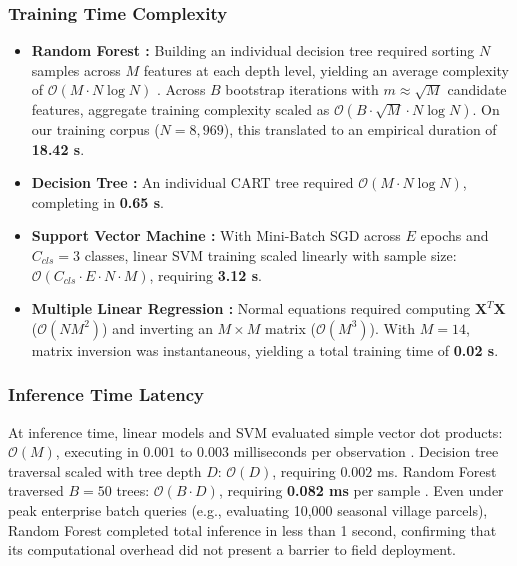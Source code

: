 \documentclass[conference]{IEEEtran}
\begin{document}
\subsubsection{Training Time Complexity}
\begin{itemize}
    \item \textbf{Random Forest \cite{breiman2001}:} Building an individual decision tree required sorting $N$ samples across $M$ features at each depth level, yielding an average complexity of $\mathcal{O}(M \cdot N \log N)$ \cite{quinlan1986}. Across $B$ bootstrap iterations with $m \approx \sqrt{M}$ candidate features, aggregate training complexity scaled as $\mathcal{O}(B \cdot \sqrt{M} \cdot N \log N)$. On our training corpus ($N=8,969$), this translated to an empirical duration of \textbf{18.42 s}.
    \item \textbf{Decision Tree \cite{quinlan1986}:} An individual CART tree required $\mathcal{O}(M \cdot N \log N)$, completing in \textbf{0.65 s}.
    \item \textbf{Support Vector Machine \cite{cortes1995}:} With Mini-Batch SGD across $E$ epochs and $C_{cls}=3$ classes, linear SVM training scaled linearly with sample size: $\mathcal{O}(C_{cls} \cdot E \cdot N \cdot M)$, requiring \textbf{3.12 s}.
    \item \textbf{Multiple Linear Regression \cite{hoerl1970}:} Normal equations required computing $\mathbf{X}^T \mathbf{X}$ ($\mathcal{O}(N M^2)$) and inverting an $M \times M$ matrix ($\mathcal{O}(M^3)$). With $M=14$, matrix inversion was instantaneous, yielding a total training time of \textbf{0.02 s}.
\end{itemize}

\subsubsection{Inference Time Latency}
At inference time, linear models and SVM evaluated simple vector dot products: $\mathcal{O}(M)$, executing in $0.001$ to $0.003$ milliseconds per observation \cite{hastie2009}. Decision tree traversal scaled with tree depth $D$: $\mathcal{O}(D)$, requiring $0.002$ ms. Random Forest traversed $B=50$ trees: $\mathcal{O}(B \cdot D)$, requiring \textbf{0.082 ms} per sample \cite{breiman2001}. Even under peak enterprise batch queries (e.g., evaluating 10,000 seasonal village parcels), Random Forest completed total inference in less than 1 second, confirming that its computational overhead did not present a barrier to field deployment.
\end{document}
